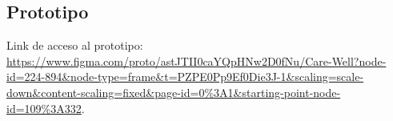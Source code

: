 \documentclass[a4paper,12pt]{article}
\begin{document}
    \subsection{Prototipo}
    \par Link de acceso al prototipo: 
    \\
    \url{https://www.figma.com/proto/astJTII0caYQpHNw2D0fNu/Care-Well?node-id=224-894&node-type=frame&t=PZPE0Pp9Ef0Die3J-1&scaling=scale-down&content-scaling=fixed&page-id=0%3A1&starting-point-node-id=109%3A332}.

    
    


    \newpage

    \printbibliography[heading=bibintoc]
\end{document}
